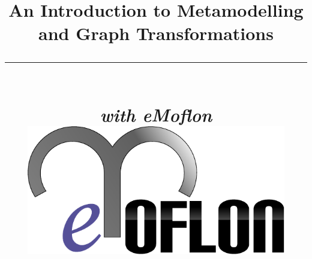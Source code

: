 \title{
\flushright
{\LARGE\bfseries An Introduction to Metamodelling\\
and Graph Transformations}
\noindent\rule[-1ex]{\textwidth}{5pt}\\[2.5ex]
\hfill\emph{\LARGE\bfseries with eMoflon}\\
\vspace{1cm}
\includegraphics[width=0.85\textwidth]{pics/eMoflon3} 
}

\date{}  
\author{} 